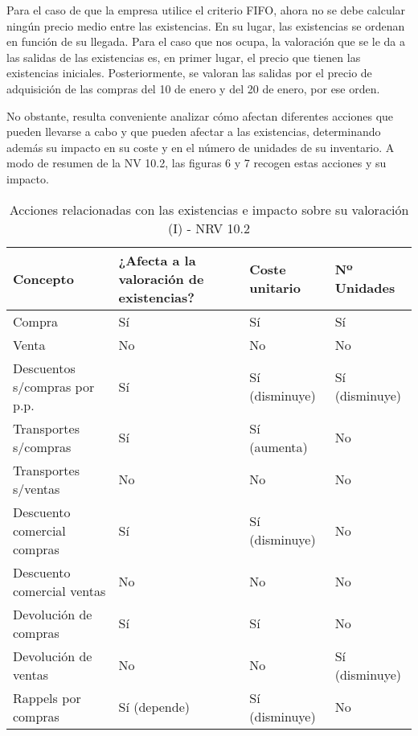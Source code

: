 \documentclass{article}
\begin{document}
Para el caso de que la empresa utilice el criterio FIFO, ahora no se debe calcular ningún precio medio entre las existencias. En su lugar, las existencias se ordenan en función de su llegada. Para el caso que nos ocupa, la valoración que se le da a las salidas de las existencias es, en primer lugar, el precio que tienen las existencias iniciales. Posteriormente, se valoran las salidas por el precio de adquisición de las compras del 10 de enero y del 20 de enero, por ese orden.

No obstante, resulta conveniente analizar cómo afectan diferentes acciones que pueden llevarse a cabo y que pueden afectar a las existencias, determinando además su impacto en su coste y en el número de unidades de su inventario. A modo de resumen de la NV 10.2, las figuras 6 y 7 recogen estas acciones y su impacto.


\begin{table}[H]
    \centering
    \begin{tabular}{|p{3cm}|p{3cm}|p{3cm}|p{3cm}|}
    \hline
    \textbf{Concepto} & \textbf{¿Afecta a la valoración de existencias?} & \textbf{Coste unitario} & \textbf{Nº Unidades} \\
    \hline
    Compra & Sí & Sí & Sí \\
    \hline
    Venta & No & No & No \\
    \hline
    Descuentos s/compras por p.p. & Sí & Sí (disminuye) & Sí (disminuye) \\
    \hline
    Transportes s/compras & Sí & Sí (aumenta) & No \\
    \hline
    Transportes s/ventas & No & No & No \\
    \hline
    Descuento comercial compras & Sí & Sí (disminuye) & No \\
    \hline
    Descuento comercial ventas & No & No & No \\
    \hline
    Devolución de compras & Sí & Sí & No \\
    \hline
    Devolución de ventas & No & No & Sí (disminuye) \\
    \hline
    Rappels por compras & Sí (depende) & Sí (disminuye) & No \\
    \hline
    \end{tabular}
    \caption{Acciones relacionadas con las existencias e impacto sobre su valoración (I) - NRV 10.2}
    \end{table}
    
\end{document}
